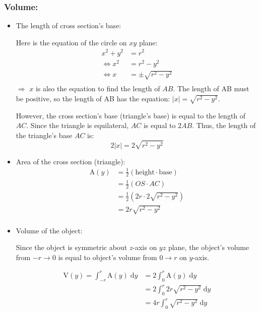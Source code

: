 \documentclass[12pt]{article}
\begin{document}
    
\subsubsection*{Volume:}
\begin{itemize}
    \item The length of cross section's base: \par
    Here is the equation of the circle on $xy$ plane:
    \begin{align*}
        x^2+y^2&=r^2 \\
        \Longleftrightarrow
        x^2&=r^2-y^2 \\
        \Longleftrightarrow
        x&=\pm \sqrt{r^2-y^2}\\
    \end{align*}
    $\Longrightarrow$ $x$ is also the equation to find the length of $AB$. The length of AB must be positive, so the length of AB has the equation: $|x|=\sqrt{r^2-y^2}$.\par
    
    However, the cross section's base (triangle's base) is equal to the length of $AC$. Since the triangle is equilateral, $AC$ is equal to $2AB$. Thus, the length of the triangle's base $AC$ is: $$2|x|=2\sqrt{r^2-y^2}$$
    
    \item Area of the cross section (triangle):
    \begin{align*}
        \text{A}(y) &=\frac{1}{2}\left(\text{height}\cdot\text{base} \right)\\
        &=\frac{1}{2}\left(OS\cdot AC\right)\\
        &=\frac{1}{2}\left(2r\cdot 2\sqrt{r^2-y^2} \right)\\
        &= 2r\sqrt{r^2-y^2}\\
    \end{align*}
    
    \item Volume of the object: \par
    Since the object is symmetric about $z$-axis on $yz$ plane, the object's volume from $-r \to 0$ is equal to object's volume from $0\to r$ on $y$-axis. \par
    \begin{align*}
        \mathrm{V}(y) = \int_{-r}^r \mathrm{A}(y)\; \mathrm{d}y
        &=2 \int_{0}^r \mathrm{A}(y)\; \mathrm{d}y \\
        &=2 \int_{0}^r 2r\sqrt{r^2-y^2} \; \mathrm{d}y\\
        &=4r \int_{0}^r \sqrt{r^2-y^2} \; \mathrm{d}y
    \end{align*}
    

\end{itemize}
\end{document}

